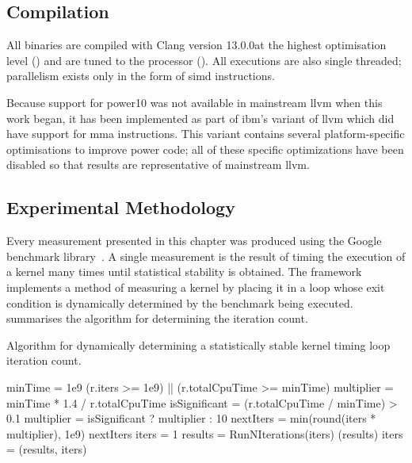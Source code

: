 \documentclass[\main/thesis.tex]{subfiles}
\begin{document}
\subsection{Compilation}
All binaries are compiled with Clang version 13.0.0\footnotemark at the highest optimisation level () and are tuned to the processor ().
All executions are also single threaded; parallelism exists only in the form of \gls{simd} instructions.

Because support for \gls{power10} was not available in mainstream \gls{llvm} when this work began, it has been implemented as part of \gls{ibm}'s variant of \gls{llvm} which did have support for \gls{mma} instructions.
This variant contains several platform-specific optimisations to improve \gls{power} code; all of these specific optimizations have been disabled so that results are representative of mainstream \gls{llvm}.

\subsection{Experimental Methodology}
Every measurement presented in this chapter was produced using the Google\texttrademark{} benchmark library~\autocite{googlebench}.\footnotemark
{}
A single measurement is the result of timing the execution of a kernel many times until statistical stability is obtained.
The framework implements a method of measuring a kernel by placing it in a loop whose exit condition is dynamically determined by the benchmark being executed.
 summarises the algorithm for determining the iteration count.

\begin{algorithm}[t]
  \caption[Algorithm for Creating a Cycle Measurement]{Algorithm for dynamically determining a statistically stable kernel timing loop iteration count.}
  \label{alg:benchmark}
  \begin{algorithmic}[1]
    \State minTime = 1e9 
      \State \Return (r.iters >= 1e9) || (r.totalCpuTime >= minTime)
    \EndFunction
      \State multiplier = minTime * 1.4 / r.totalCpuTime
      \State isSignificant = (r.totalCpuTime / minTime) > 0.1
      \State multiplier = isSignificant ? multiplier : 10
      \State nextIters = min(round(iters * multiplier), 1e9)
      \State \Return nextIters
    \EndFunction
      \State iters = 1
        \State results = RunNIterations(iters)
          \State {}(results)
          \State \Return
        \EndIf
        \State iters = (results, iters)
      \EndWhile
    \EndFunction
  \end{algorithmic}
\end{algorithm}
\end{document}

